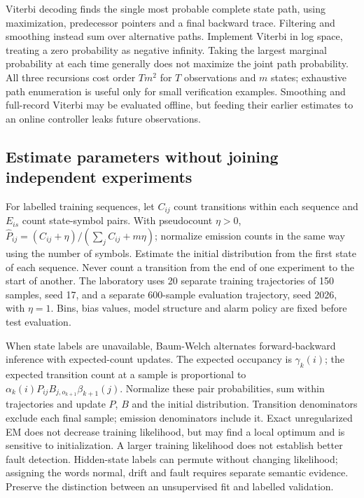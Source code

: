 \documentclass[11pt,a4paper]{article}
\begin{document}
Viterbi decoding finds the single most probable complete state path, using maximization, predecessor pointers and a final backward trace. Filtering and smoothing instead sum over alternative paths. Implement Viterbi in log space, treating a zero probability as negative infinity. Taking the largest marginal probability at each time generally does not maximize the joint path probability. All three recursions cost order $Tm^2$ for $T$ observations and $m$ states; exhaustive path enumeration is useful only for small verification examples. Smoothing and full-record Viterbi may be evaluated offline, but feeding their earlier estimates to an online controller leaks future observations.


\subsection{Estimate parameters without joining independent experiments}

For labelled training sequences, let $C_{ij}$ count transitions within each sequence and $E_{is}$ count state-symbol pairs. With pseudocount $\eta>0$, $\hat P_{ij}=(C_{ij}+\eta)/(\sum_jC_{ij}+m\eta)$; normalize emission counts in the same way using the number of symbols. Estimate the initial distribution from the first state of each sequence. Never count a transition from the end of one experiment to the start of another. The laboratory uses 20 separate training trajectories of 150 samples, seed 17, and a separate 600-sample evaluation trajectory, seed 2026, with $\eta=1$. Bins, bias values, model structure and alarm policy are fixed before test evaluation.


When state labels are unavailable, Baum-Welch alternates forward-backward inference with expected-count updates. The expected occupancy is $\gamma_k(i)$; the expected transition count at a sample is proportional to $\alpha_k(i)P_{ij}B_{j,o_{k+1}}\beta_{k+1}(j)$. Normalize these pair probabilities, sum within trajectories and update $P$, $B$ and the initial distribution. Transition denominators exclude each final sample; emission denominators include it. Exact unregularized EM does not decrease training likelihood, but may find a local optimum and is sensitive to initialization. A larger training likelihood does not establish better fault detection. Hidden-state labels can permute without changing likelihood; assigning the words normal, drift and fault requires separate semantic evidence. Preserve the distinction between an unsupervised fit and labelled validation.
\end{document}
